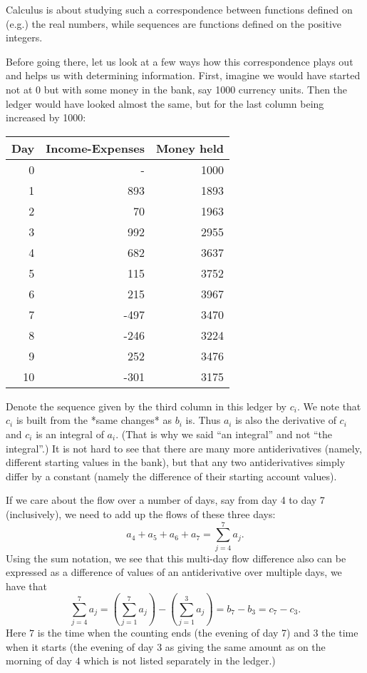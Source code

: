 Calculus is about studying such a correspondence between functions defined on
(e.g.) the real numbers, while sequences are functions defined on the
positive integers.

Before going there, let us look at a few ways how this correspondence plays
out and helps us with determining information.
First, imagine we would have started not at 0 but with some money in the
bank, say 1000 currency units. Then the ledger would have looked almost the
same, but for the last column being increased by 1000:

\begin{center}
\begin{tabular}{rrr}
Day&Income-Expenses&Money held\\
\hline
0& - &1000\\
1&893&1893\\
2&70&1963\\
3&992&2955\\
4&682&3637\\
5&115&3752\\
6&215&3967\\
7&-497&3470\\
8&-246&3224\\
9&252&3476\\
10&-301&3175\\
\end{tabular}
\end{center}

Denote the sequence given by the third column in this ledger by $c_i$. We
note that $c_i$ is built from the *same changes* as $b_i$ is. Thus $a_i$ is
also the derivative of $c_i$ and $c_i$ is an integral of $a_i$. (That is why
we said ``an integral'' and not ``the integral''.) It is not hard to see that
there are many more antiderivatives (namely, different starting values in the
bank), but that any two antiderivatives simply differ by a constant (namely
the difference of their starting account values).

If we care about the flow over a number of days, say from day 4 to day 7
(inclusively), we need to add up the flows of these three days:
$$a_4+a_5+a_6+a_7=\sum_{j=4}^7 a_j.$$
Using the sum notation, we see that this multi-day flow difference also can
be expressed as a difference of values of an antiderivative over multiple
days, we have that
$$\sum_{j=4}^7 a_j=(\sum_{j=1}^7 a_j)-(\sum_{j=1}^3 a_j)=b_7-b_3=c_7-c_3.$$
Here $7$ is the time when the counting ends (the evening of day 7) and $3$
the time when it starts (the evening of day $3$ as giving the same amount as
on the morning of day $4$ which is not listed separately in the ledger.)

